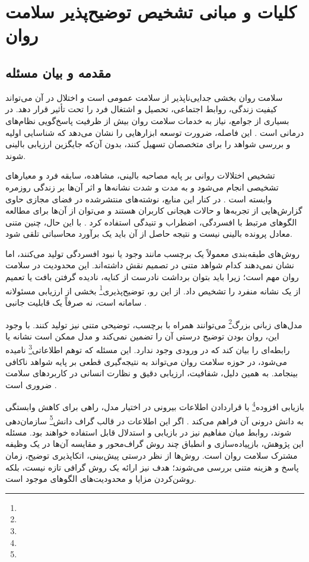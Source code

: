 \renewcommand{\baselinestretch}{1.75}\selectfont

\chapter{کلیات و مبانی تشخیص توضیح‌پذیر سلامت روان}

\section{مقدمه و بیان مسئله}

سلامت روان بخشی جدایی‌ناپذیر از سلامت عمومی است و اختلال در آن می‌تواند کیفیت زندگی، روابط اجتماعی، تحصیل و اشتغال فرد را تحت تأثیر قرار دهد. در بسیاری از جوامع، نیاز به خدمات سلامت روان بیش از ظرفیت پاسخ‌گویی نظام‌های درمانی است \cite{who2022mentalhealth}. این فاصله، ضرورت توسعه ابزارهایی را نشان می‌دهد که شناسایی اولیه و بررسی شواهد را برای متخصصان تسهیل کنند، بدون آن‌که جایگزین ارزیابی بالینی شوند.

تشخیص اختلالات روانی بر پایه مصاحبه بالینی، مشاهده، سابقه فرد و معیارهای تشخیصی انجام می‌شود و به مدت و شدت نشانه‌ها و اثر آن‌ها بر زندگی روزمره وابسته است \cite{kupfer2013dsm5}. در کنار این منابع، نوشته‌های منتشرشده در فضای مجازی حاوی گزارش‌هایی از تجربه‌ها و حالات هیجانی کاربران هستند و می‌توان از آن‌ها برای مطالعه الگوهای مرتبط با افسردگی، اضطراب و تنیدگی استفاده کرد \cite{shen2017depression,sarkar2023predicting}. با این حال، چنین متنی معادل پرونده بالینی نیست و نتیجه حاصل از آن باید یک برآورد محاسباتی تلقی شود.

روش‌های طبقه‌بندی معمولاً یک برچسب مانند وجود یا نبود افسردگی تولید می‌کنند، اما نشان نمی‌دهند کدام شواهد متنی در تصمیم نقش داشته‌اند. این محدودیت در سلامت روان مهم است؛ زیرا باید بتوان برداشت نادرست از کنایه، نادیده گرفتن بافت یا تعمیم از یک نشانه منفرد را تشخیص داد. از این رو، توضیح‌پذیری\footnote{} بخشی از ارزیابی مسئولانه سامانه است، نه صرفاً یک قابلیت جانبی \cite{joyce2023explainable}.

مدل‌های زبانی بزرگ\footnote{} می‌توانند همراه با برچسب، توضیحی متنی نیز تولید کنند. با وجود این، روان بودن توضیح درستی آن را تضمین نمی‌کند و مدل ممکن است نشانه یا رابطه‌ای را بیان کند که در ورودی وجود ندارد. این مسئله که توهم اطلاعاتی\footnote{} نامیده می‌شود، در حوزه سلامت روان می‌تواند به نتیجه‌گیری قطعی بر پایه شواهد ناکافی بینجامد. به همین دلیل، شفافیت، ارزیابی دقیق و نظارت انسانی در کاربردهای سلامت ضروری است \cite{who2021aiethics,who2023safeai}.

بازیابی افزوده\footnote{} با قراردادن اطلاعات بیرونی در اختیار مدل، راهی برای کاهش وابستگی به دانش درونی آن فراهم می‌کند \cite{lewis2020retrieval}. اگر این اطلاعات در قالب گراف دانش\footnote{} سازمان‌دهی شوند، روابط میان مفاهیم نیز در بازیابی و استدلال قابل استفاده خواهند بود. مسئله این پژوهش، بازپیاده‌سازی و انطباق چند روش گراف‌محور و مقایسه آن‌ها در یک وظیفه مشترک سلامت روان است. روش‌ها از نظر درستی پیش‌بینی، اتکاپذیری توضیح، زمان پاسخ و هزینه متنی بررسی می‌شوند؛ هدف نیز ارائه یک روش گرافی تازه نیست، بلکه روشن‌کردن مزایا و محدودیت‌های الگوهای موجود است.

